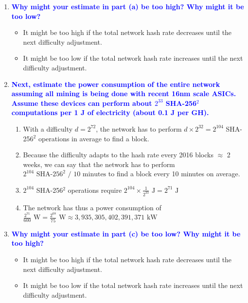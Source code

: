 \documentclass[11pt]{article}
\begin{document}
\begin{enumerate}
\begin{enumerate}
    \item \textbf{\textcolor{blue}{Why might your estimate in part (a) be too high? Why might it be too low?}}
        \begin{itemize}
            \item It might be too high if the total network hash rate decreases until the next difficulty adjustment.
            \item It might be too low if the total network hash rate increases until the next difficulty adjustment.
        \end{itemize}
        
    \item \textbf{\textcolor{blue}{Next, estimate the power consumption of the entire network assuming all mining is being done with recent 16nm scale ASICs. Assume these devices can perform about $2^{33}$ SHA-256$^2$ computations per 1 J of electricity (about 0.1 J per GH).}}
        \begin{enumerate}
            \item With a difficulty $d = 2^{72}$, the network has to perform $d \times 2^{32} = 2^{104}$ SHA-256$^2$ operations in average to find a block.
            \item Because the difficulty adapts to the hash rate every 2016 blocks $\approx$ 2 weeks, we can say that the network has to perform $2^{104} \text{ SHA-256}^2 \text{ / 10 minutes}$ to find a block every 10 minutes on average.
            \item $2^{104}$ SHA-256$^2$ operations require $2^{104} \times \frac{1}{2^{33}} \text{ J} = 2^{71} \text{ J}$
            \item The network has thus a power consumption of $\frac{2^{71}}{600} \text{ W} = \frac{2^{68}}{75} \text{ W} \approx 3,935,305,402,391,371 \text{ kW}$
        \end{enumerate}
        
    \item \textbf{\textcolor{blue}{Why might your estimate in part (c) be too low? Why might it be too high?}}
        \begin{itemize}
            \item It might be too high if the total network hash rate decreases until the next difficulty adjustment.
            \item It might be too low if the total network hash rate increases until the next difficulty adjustment.
        \end{itemize}
    \end{enumerate}


\end{enumerate}
\end{document}
